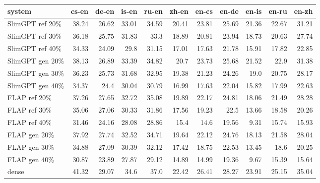 \begin{tabular}{lrrrrrrrrrr}
\toprule
system & cs-en & de-en & is-en & ru-en & zh-en & en-cs & en-de & en-is & en-ru & en-zh \\
\midrule
SlimGPT ref 20\% & 38.24 & 26.62 & 33.01 & 34.59 & 20.41 & 23.81 & 25.69 & 21.36 & 22.67 & 31.21 \\
SlimGPT ref 30\% & 36.18 & 25.75 & 31.83 & 33.3 & 18.89 & 20.81 & 23.94 & 18.73 & 20.63 & 27.74 \\
SlimGPT ref 40\% & 34.33 & 24.09 & 29.8 & 31.15 & 17.01 & 17.63 & 21.78 & 15.91 & 17.82 & 22.85 \\
SlimGPT gen 20\% & 38.13 & 26.89 & 33.39 & 34.82 & 20.7 & 23.73 & 25.68 & 21.52 & 22.9 & 31.38 \\
SlimGPT gen 30\% & 36.23 & 25.73 & 31.68 & 32.95 & 19.38 & 21.23 & 24.26 & 19.0 & 20.75 & 28.17 \\
SlimGPT gen 40\% & 34.37 & 24.4 & 30.04 & 30.79 & 16.99 & 17.63 & 22.04 & 15.82 & 17.99 & 22.63 \\
FLAP ref 20\% & 37.26 & 27.65 & 32.72 & 35.08 & 19.89 & 22.17 & 24.81 & 18.06 & 21.49 & 28.28 \\
FLAP ref 30\% & 35.06 & 27.06 & 30.33 & 31.86 & 17.56 & 19.23 & 22.5 & 13.66 & 18.58 & 20.26 \\
FLAP ref 40\% & 31.46 & 24.16 & 28.08 & 28.86 & 15.4 & 14.6 & 19.56 & 9.31 & 15.74 & 15.93 \\
FLAP gen 20\% & 37.92 & 27.74 & 32.52 & 34.71 & 19.64 & 22.12 & 24.76 & 18.13 & 21.58 & 28.04 \\
FLAP gen 30\% & 34.88 & 27.09 & 30.39 & 32.12 & 17.42 & 18.75 & 22.53 & 13.45 & 18.6 & 20.25 \\
FLAP gen 40\% & 30.87 & 23.89 & 27.87 & 29.12 & 14.89 & 14.99 & 19.36 & 9.67 & 15.39 & 15.64 \\
dense & 41.32 & 29.07 & 34.6 & 37.0 & 22.42 & 26.41 & 28.27 & 23.91 & 25.15 & 35.04 \\
\bottomrule
\end{tabular}
